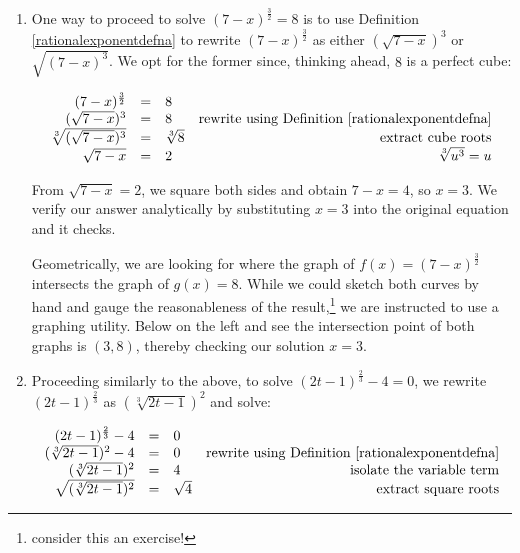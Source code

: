 \documentclass{ximera}
\begin{document}
\begin{example}
\begin{enumerate}

\item  One way to proceed to solve  $(7-x)^{\frac{3}{2}} = 8$ is to use Definition \ref{rationalexponentdefna} to rewrite $(7-x)^{\frac{3}{2}}$ as either $(\sqrt{7-x})^3$ or $\sqrt{(7-x)^3}$.  We opt for the former since, thinking ahead,  $8$ is a perfect cube: 

\[ \begin{array}{rclr}

(7-x)^{\frac{3}{2}} & = & 8 & \\

(\sqrt{7-x})^3 & = & 8 & \text{rewrite using Definition \ref{rationalexponentdefna}} \\

\sqrt[3]{(\sqrt{7-x})^3} & = & \sqrt[3]{8} & \text{extract cube roots}  \\

\sqrt{7-x} & = & 2 & \text{$\sqrt[3]{u^3}= u$} \\ \end{array} \]

From $\sqrt{7-x} =  2$, we square both sides and obtain $7-x = 4$, so $x = 3$.  We verify our answer analytically by substituting $x=3$ into the original equation and it checks.

Geometrically, we are looking for where the graph of $f(x) = (7-x)^{\frac{3}{2}}$ intersects the graph of $g(x) = 8$.  While we could sketch both curves by hand and gauge the reasonableness of the result,\footnote{consider this an exercise!} we are instructed to use a graphing utility.  Below on the left and see the intersection point of both graphs is $(3,8)$, thereby checking our solution $x = 3$.

\item  Proceeding similarly to the above, to solve $(2t-1)^{\frac{2}{3}} -4 = 0$, we rewrite $(2t-1)^{\frac{2}{3}}$ as $(\sqrt[3]{2t-1})^2$ and solve:

\[ \begin{array}{rclr}
(2t-1)^{\frac{2}{3}} -4  & = & 0 & \\

(\sqrt[3]{2t-1})^2 - 4 & = & 0 & \text{rewrite using Definition \ref{rationalexponentdefna}} \\
(\sqrt[3]{2t-1})^2 & = & 4 & \text{isolate the variable term} \\

\sqrt{(\sqrt[3]{2t-1})^2 } & = & \sqrt{4} & \text{extract square roots} \\


\end{array}\]
\end{enumerate}
\end{example}
\end{document}

